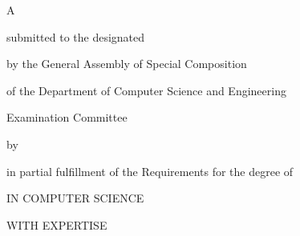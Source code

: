 \makeatletter

{\LARGE \@titleEn}

{\Large
    \vfill \vfill A \MakeUppercase{\csethesisTypeEn}

    \vfill        submitted to the designated

    \vfill        by the General Assembly of Special Composition

                  of the Department of Computer Science and Engineering

                  Examination Committee

    \vfill        by

    \vfill        {\LARGE \@authorEn}

    \vfill        in partial fulfillment of the Requirements for the degree of

    \vfill        \MakeUppercase{\csediplwmaEn}

    \ifPhD\else
                  IN COMPUTER SCIENCE

                  WITH EXPERTISE

                  \EkseidikseusiEn
    \fi

    \vfill \vfill \@dateEn
}

\makeatother
\clearpage
